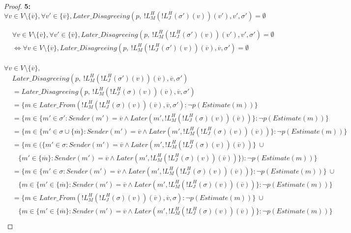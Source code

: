 \begin{proof}
\textbf{5:} $\forall v \in V \setminus \{\overline{v}\}, \forall v' \in \{\overline{v}\}, Later\_Disagreeing(p,~!L^H_M(!L^H_J(\sigma')(v))(v'), v', \sigma') = \emptyset$


\begin{align}
&\forall v \in V \setminus \{\overline{v}\}, \forall v' \in \{\overline{v}\}, Later\_Disagreeing(p,~!L^H_M(!L^H_J(\sigma')(v))(v'), v', \sigma') = \emptyset \\
&\iff \forall v \in V \setminus \{\overline{v}\}, Later\_Disagreeing(p,~!L^H_M(!L^H_J(\sigma')(v))(\overline{v}), \overline{v}, \sigma') = \emptyset \\
\end{align}

$\forall v \in V \setminus \{\overline{v}\},$
\begin{align}
&Later\_Disagreeing(p,~!L^H_M(!L^H_J(\sigma')(v))(\overline{v}), \overline{v}, \sigma') \\
&= Later\_Disagreeing(p,~!L^H_M(!L^H_J(\sigma)(v))(\overline{v}), \overline{v}, \sigma')\\
&= \{m \in Later\_From(!L^H_M(!L^H_J(\sigma)(v))(\overline{v}), \overline{v}, \sigma') : \neg p(Estimate(m)) \} \\
&= \{m \in \{m' \in \sigma' : Sender(m') = \overline{v} \land Later(m', !L^H_M(!L^H_J(\sigma)(v))(\overline{v}))\} : \neg p(Estimate(m)) \} \\
&= \{m \in \{m' \in \sigma \cup \{\overline{m}\} : Sender(m') = \overline{v} \land Later(m', !L^H_M(!L^H_J(\sigma)(v))(\overline{v}))\} : \neg p(Estimate(m)) \} \\
&= \{m \in \big(\{m' \in \sigma : Sender(m') = \overline{v} \land Later(m', !L^H_M(!L^H_J(\sigma)(v))(\overline{v}))\}~ \cup \\
&~~~~\{m' \in \{\overline{m}\} : Sender(m') = \overline{v} \land Later(m', !L^H_M(!L^H_J(\sigma)(v))(\overline{v}))\}\big) : \neg p(Estimate(m)) \} \\
&= \{m \in \{m' \in \sigma : Sender(m') = \overline{v} \land Later(m', !L^H_M(!L^H_J(\sigma)(v))(\overline{v}))\} : \neg p(Estimate(m)) \} ~ \cup \\
&~~~~\{m \in \{m' \in \{\overline{m}\} : Sender(m') = \overline{v} \land Later(m', !L^H_M(!L^H_J(\sigma)(v))(\overline{v}))\} : \neg p(Estimate(m)) \} \\
&= \{m \in Later\_From(!L^H_M(!L^H_J(\sigma)(v))(\overline{v}), \overline{v}, \sigma) : \neg p(Estimate(m)) \} ~ \cup \\
&~~~~\{m \in \{m' \in \{\overline{m}\} : Sender(m') = \overline{v} \land Later(m', !L^H_M(!L^H_J(\sigma)(v))(\overline{v}))\} : \neg p(Estimate(m)) \} \\

\end{align}
\end{proof}
